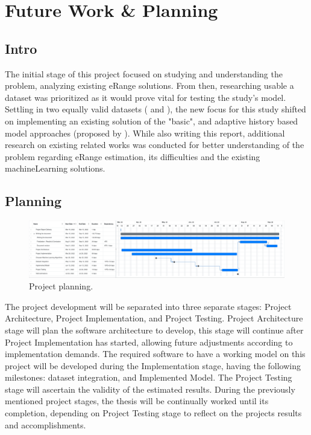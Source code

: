 \chapter{Future Work \& Planning}
\label{cha:planning}
\section{Intro}
\label{sec:planningIntro}
The initial stage of this project focused on 
studying and understanding the problem,
analyzing existing \gls{eRange} solutions.
From then, researching usable a \gls{dataset}
was prioritized as it would prove vital
for testing the study's model.
Settling in two equally valid \glspl{dataset}
(\cite{vedDataset} and \cite{emobpy}),
the new focus for this study shifted on
implementing an existing solution of 
the "basic", and adaptive history based model
approaches (proposed by \cite{classicEVX}).
While also writing this report,
additional research on existing related works 
was conducted for better understanding
of the problem regarding \gls{eRange} estimation, 
its difficulties and the existing 
\gls{machineLearning} solutions.

\section{Planning}
\label{sec:planningPlanning}

\begin{figure}[H]
    \begin{center}
        \includegraphics[scale=0.20]{../figures/planning}
        \caption{Project planning.}
    \end{center}
\end{figure}

The project development will be separated into three 
separate stages: Project Architecture, 
Project Implementation, and Project Testing.
Project Architecture stage will plan the software
architecture to develop, this stage will continue 
after Project Implementation has started, allowing
future adjustments according to implementation demands.
The required software to have a working model on this project
will be developed during the Implementation stage,
having the following milestones: \Gls{dataset} integration, 
and Implemented Model. The Project Testing stage
will ascertain the validity of the estimated results. 
During the previously mentioned project stages, 
the thesis will be continually worked until
its completion, depending on Project Testing stage
to reflect on the projects results and accomplishments.
